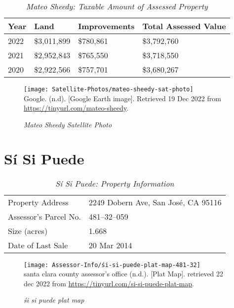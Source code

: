 \begin{table}[hbt]
  \SingleSpacing%
  \caption[Mateo Sheedy: Taxable Amount of Assessed Propery]{\textit{Mateo Sheedy: Taxable Amount of Assessed Property}}\label{tab:mateo-sheedy-taxable-amount}
  \begin{tabular}{llll}
    \toprule
    Year & Land        & Improvements & Total Assessed Value \\
    \midrule
    2022 & \$3,011,899 & \$780,861    & \$3,792,760 \\
    2021 & \$2,952,843 & \$765,550    & \$3,718,550 \\
    2020 & \$2,922,566 & \$757,701    & \$3,680,267 \\
    \bottomrule
  \end{tabular}
\end{table}

\begin{figure}[hbt]
  \caption[Mateo Sheedy Satellite Photo]{\textit{Mateo Sheedy Satellite Photo}}\label{fig:mateo-sheedy-sat-photo}
  \texttt{[image: Satellite-Photos/mateo-sheedy-sat-photo]}\\ %
  \footnotesize{Google. (n.d). [Google Earth image]. Retrieved 19 Dec 2022 from \url{https://tinyurl.com/mateo-sheedy}.}
\end{figure}


\clearpage
\section{Sí Si Puede}\label{sec:sí-si-puede-info}
\begin{table}[htb]
  \SingleSpacing%
  \caption[Sí Si Puede: Property Information]{\textit{Sí Si Puede: Property Information}}\label{tab:sí-si-puede-prop-info}
  \begin{tabular}{ll}
    \toprule
    Property Address      & 2249 Dobern Ave, San José, CA 95116 \\
    Assessor's Parcel No. &  481–32–059 \\
    Size (acres)          &  1.668\\
    Date of Last Sale     &  20 Mar 2014 \\
    \bottomrule
  \end{tabular}
\end{table}

\begin{figure}[hbt]
  \centering
  \caption[śi si puede plat map]{\textit{śi si puede plat map}}\label{fig:śi-si-puede-plat-map}
  \texttt{[image: Assessor-Info/śi-si-puede-plat-map-481-32]}\\ %
  \footnotesize{santa clara county assessor's office (n.d.). [Plat Map]. retrieved 22 dec 2022 from \url{https://tinyurl.com/si-si-puede-plat-map}}.
\end{figure}

